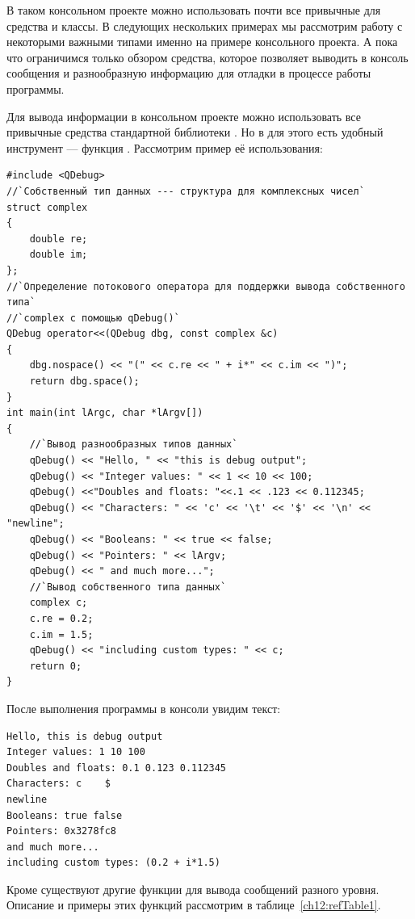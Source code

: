 В таком консольном проекте можно использовать почти все привычные для  средства и классы. В следующих
нескольких примерах мы рассмотрим работу с некоторыми важными типами  именно на примере
консольного проекта. А пока что ограничимся только обзором средства, которое позволяет выводить в консоль сообщения и
разнообразную информацию для отладки в процессе работы программы.

Для вывода информации в консольном  проекте можно использовать все привычные средства
стандартной библиотеки . Но в  для этого есть удобный инструмент --- функция
. Рассмотрим пример её использования:
\begin{lstlisting}
#include <QDebug>
//`Собственный тип данных --- структура для комплексных чисел`
struct complex
{
    double re;
    double im;
};
//`Определение потокового оператора для поддержки вывода собственного типа`
//`complex с помощью qDebug()`
QDebug operator<<(QDebug dbg, const complex &c)
{
    dbg.nospace() << "(" << c.re << " + i*" << c.im << ")";
    return dbg.space();
}
int main(int lArgc, char *lArgv[])
{
    //`Вывод разнообразных типов данных`
    qDebug() << "Hello, " << "this is debug output";
    qDebug() << "Integer values: " << 1 << 10 << 100;
    qDebug() <<"Doubles and floats: "<<.1 << .123 << 0.112345;
    qDebug() << "Characters: " << 'c' << '\t' << '$' << '\n' << "newline";
    qDebug() << "Booleans: " << true << false;
    qDebug() << "Pointers: " << lArgv;
    qDebug() << " and much more...";
    //`Вывод собственного типа данных`
    complex c;
    c.re = 0.2;
    c.im = 1.5;
    qDebug() << "including custom types: " << c;
    return 0;
}
\end{lstlisting}

После выполнения программы в консоли увидим текст:
\begin{verbatim}
Hello, this is debug output 
Integer values: 1 10 100 
Doubles and floats: 0.1 0.123 0.112345 
Characters: c    $ 
newline 
Booleans: true false 
Pointers: 0x3278fc8 
and much more... 
including custom types: (0.2 + i*1.5)
\end{verbatim} 

Кроме  существуют другие функции для вывода сообщений разного уровня.
Описание и примеры этих функций рассмотрим в таблице~\ref{ch12:refTable1}.

